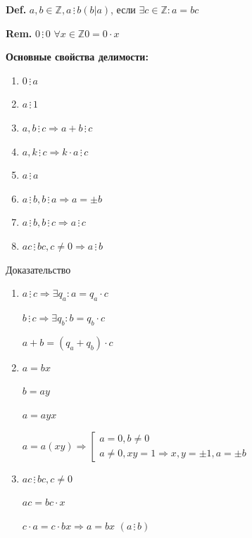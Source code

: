 \documentclass[14pt, letter paper]{article}
\begin{document}
\textbf{Def.} $a, b \in \mathbb{Z}, a \, \vdots \, b (b | a)$, если $\exists c \in \mathbb{Z}: a = bc$

\textbf{Rem.} $0 \, \vdots \, 0$ $\forall x \in \mathbb{Z} 0 = 0 \cdot x$

\textbf{Основные свойства делимости:}
\begin{enumerate}
    \item $0 \, \vdots \, a$
    \item $a \, \vdots \, 1$
    \item $a, b \, \vdots \, c \Rightarrow a + b \, \vdots \, c$
    \item $a, k \, \vdots \, c \Rightarrow k \cdot a \, \vdots \, c$
    \item $a \, \vdots \, a$
    \item $a \, \vdots \, b, b \, \vdots \, a \Rightarrow a = \pm b$
    \item $a \, \vdots \, b, b \, \vdots \, c \Rightarrow a \, \vdots \, c$
    \item $ac \, \vdots \, bc, c \neq 0 \Rightarrow a \, \vdots \, b$
\end{enumerate}

\begin{center}
    Доказательство
\end{center}

\begin{enumerate}
    \item[3.] $a \, \vdots \, c \Rightarrow \exists q_a: a = q_a \cdot c$

    $b \, \vdots \, c \Rightarrow \exists q_b: b = q_b \cdot c$

    $a + b = (q_a + q_b) \cdot c$

    \item[6.] $a = bx$

    $b = ay$

    $a = ayx$

    $a = a(xy) \Rightarrow \left[ \begin{gathered} a = 0, b \neq 0 \\ a \neq 0, xy = 1 \Rightarrow x, y = \pm 1, a = \pm b \end{gathered} \right.$

    \item[8.] $ac \, \vdots \, bc, c \neq 0$ 
    
    $ac = bc \cdot x$

    $c \cdot a = c \cdot bx \Rightarrow a = bx$ $(a \, \vdots \, b)$
\end{enumerate}
\end{document}

